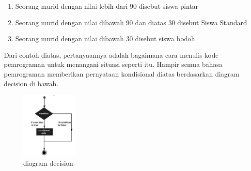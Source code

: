 \begin{enumerate} \par
\item
Seorang murid dengan nilai lebih dari 90 disebut siswa pintar \par
\item
Seorang murid dengan nilai dibawah 90 dan diatas 30 disebut Siswa Standard \par
\item
Seorang murid dengan nilai dibawah 30 disebut siswa bodoh \par
\end{enumerate}\par

Dari contoh diatas, pertanyaannya adalah bagaimana cara menulis kode pemrograman untuk menangani situasi seperti itu. Hampir semua bahasa pemrograman memberikan pernyataan kondisional diatas berdasarkan diagram decision di bawah. \par
\begin{figure}[ht]
	    \centerline{\includegraphics[width=0.25\textwidth]{figures/diagram_decision.png}}
	    \caption{diagram decision}
	    \label{diagram_decision}
	    \end{figure} \par

